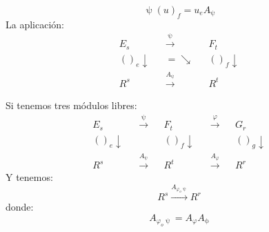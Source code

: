 \documentclass[11pt,a4paper]{article}
\theoremstyle{break}
\begin{document}
$$\uppsi(u)_{f} = u_{e} A_{\uppsi}$$
La aplicación:
$$\begin{aligned}
E_{s} & & \overset{\uppsi}{\to} & & F_{t} \\
()_{e} \downarrow & & =\searrow & & ()_{f} \downarrow \\
R^{s} & & \overset{A_{\uppsi}}{\to} & & R^{t}
\end{aligned}$$

Si tenemos tres módulos libres:
$$\begin{aligned}
E_{s} & & \overset{\uppsi}{\to} & & F_{t} & & \overset{\varphi}{\to} & & G_{r} \\
()_{e} \downarrow & & & & ()_{f} \downarrow & & & & ()_{g} \downarrow \\
R^{s} & & \overset{A_{\uppsi}}{\to} & & R^{t} & & \overset{A_{\varphi}}{\to} & & R^{r}
\end{aligned}$$
Y tenemos:
$$R^{s} \overset{A_{\varphi_{o}\uppsi}}{\to} R^{r}$$
donde:
$$A_{\varphi_{o}\uppsi} = A_{\varphi} A_{\upphi}$$
\end{document}
